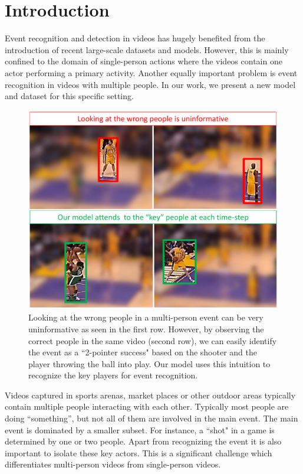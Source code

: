\section{Introduction}

Event recognition and detection in videos has hugely benefited from the
introduction of recent large-scale datasets
\cite{THUMOS,UCF101,Karpathy_CVPR14,MED11} and models.  However, this is mainly
confined to the domain of single-person actions where the videos contain one
actor performing a primary activity.  Another equally important problem is
event recognition in videos with multiple people. In our work, we present a new
model and dataset for this specific setting.

\begin{figure}[ht!]
\begin{center}
  \includegraphics[width=3.2 in]{images/pull_figure_v3_cropped.pdf}
\end{center}
\caption{Looking at the wrong people in a multi-person event can be very uninformative
  as seen in the first row. However, by observing the correct people in the same video
  (second row), we can easily identify the event as a ``2-pointer success" based
  on the shooter and
the player throwing the ball into play. Our model uses this intuition
to recognize the key players for event recognition.}
\label{fig:pull_figure}
\end{figure}

Videos captured in sports arenas, market places or other outdoor areas
typically contain multiple people interacting with each other.
Typically most people are doing ``something'', but not all of them are involved in the main event.
The main event is dominated by a smaller subset. For instance, a ``shot" in a game
 is determined by one or two people.
Apart from recognizing the event it is also important
to isolate these key actors. This is a significant challenge which
differentiates multi-person videos from single-person videos.


